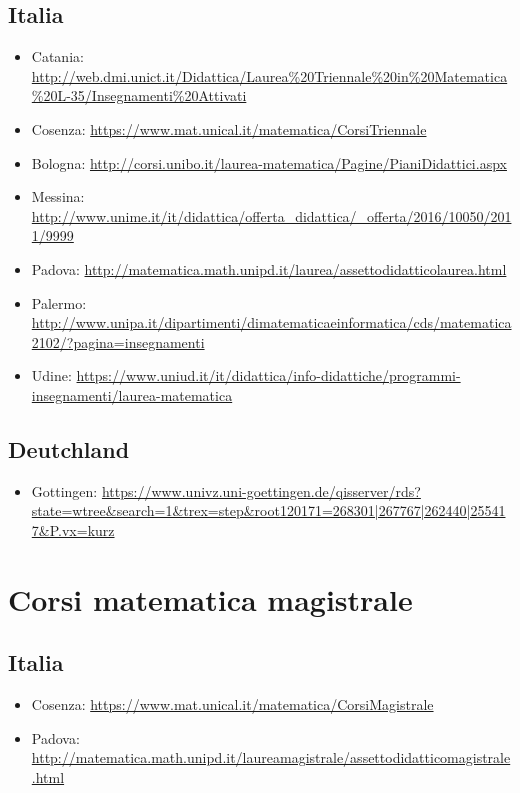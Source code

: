 \documentclass[a4paper,10pt]{article}
\begin{document}
\subsection*{Italia}
\begin{itemize}
 \item Catania: \url{http://web.dmi.unict.it/Didattica/Laurea%20Triennale%20in%20Matematica%20L-35/Insegnamenti%20Attivati}
 \item Cosenza: \url{https://www.mat.unical.it/matematica/CorsiTriennale}
 \item Bologna: \url{http://corsi.unibo.it/laurea-matematica/Pagine/PianiDidattici.aspx}
 \item Messina: \url{http://www.unime.it/it/didattica/offerta_didattica/_offerta/2016/10050/2011/9999}
 \item Padova: \url{http://matematica.math.unipd.it/laurea/assettodidatticolaurea.html}
 \item Palermo: \url{http://www.unipa.it/dipartimenti/dimatematicaeinformatica/cds/matematica2102/?pagina=insegnamenti}
 \item Udine: \url{https://www.uniud.it/it/didattica/info-didattiche/programmi-insegnamenti/laurea-matematica}
\end{itemize}

\subsection{Deutchland}
\begin{itemize}
 \item Gottingen: \url{https://www.univz.uni-goettingen.de/qisserver/rds?state=wtree&search=1&trex=step&root120171=268301|267767|262440|255417&P.vx=kurz}
\end{itemize}


\section*{Corsi matematica magistrale}
\subsection*{Italia}
\begin{itemize}
 \item Cosenza: \url{https://www.mat.unical.it/matematica/CorsiMagistrale}
 \item Padova: \url{http://matematica.math.unipd.it/laureamagistrale/assettodidatticomagistrale.html}
\end{itemize}
\end{document}
